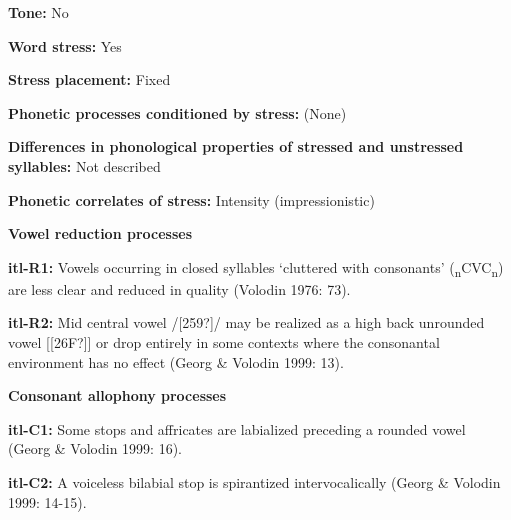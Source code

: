 \begin{styleBody}
\textbf{Tone:} No
\end{styleBody}

\begin{styleBody}
\textbf{Word stress:} Yes
\end{styleBody}

\begin{styleBody}
\textbf{Stress placement:} Fixed
\end{styleBody}

\begin{styleBody}
\textbf{Phonetic processes conditioned by stress:} (None)
\end{styleBody}

\begin{styleBody}
\textbf{Differences in phonological properties of stressed and unstressed syllables:} Not described
\end{styleBody}

\begin{styleBody}
\textbf{Phonetic correlates of stress: }Intensity (impressionistic)
\end{styleBody}

\begin{styleBody}
\textbf{Vowel reduction processes}
\end{styleBody}

\begin{styleBody}
\textbf{itl-R1:} Vowels occurring in closed syllables ‘cluttered with consonants’ (\textsubscript{n}CVC\textsubscript{n}) are less clear and reduced in quality (Volodin 1976: 73).
\end{styleBody}

\begin{styleBody}
\textbf{itl-R2:} Mid central vowel /[259?]/ may be realized as a high back unrounded vowel [[26F?]] or drop entirely in some contexts where the consonantal environment has no effect (Georg \& Volodin 1999: 13).
\end{styleBody}

\begin{styleBody}
\textbf{Consonant allophony processes}
\end{styleBody}

\begin{styleBody}
\textbf{itl-C1: }Some stops and affricates are labialized preceding a rounded vowel (Georg \& Volodin 1999: 16).
\end{styleBody}

\begin{styleBody}
\textbf{itl-C2: }A voiceless bilabial stop is spirantized intervocalically (Georg \& Volodin 1999: 14-15).
\end{styleBody}

